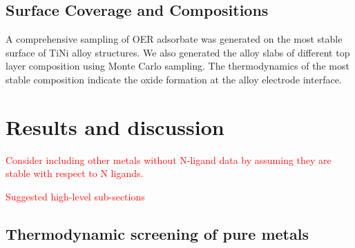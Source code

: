 \documentclass[journal=jacsat,manuscript=article]{achemso}
\begin{document}

\subsection{Surface Coverage and Compositions}

A comprehensive sampling of OER adsorbate was generated on the most stable surface of TiNi alloy structures. We also generated the alloy slabs of different top layer composition using Monte Carlo sampling. The thermodynamics of the most stable composition indicate the oxide formation at the alloy electrode interface. 



\section{Results and discussion}

\textcolor{red}{Consider including other metals without N-ligand data by assuming they are stable with respect to N ligands.}


\textcolor{red}{Suggested high-level sub-sections}
\subsection{Thermodynamic screening of pure metals}
\end{document}
